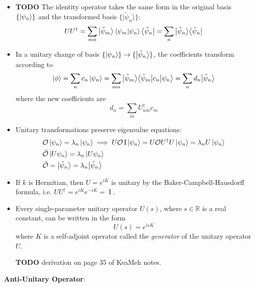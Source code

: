 \documentclass[11pt, a4paper]{article}
\newcommand{\Herm}{Hermitian\xspace}
\renewcommand{\t}[1]{\tilde{#1}}
\renewcommand{\O}{\mathcal{O}}  %
\newcommand{\II}{\operatorname{I}}  %
\newcommand{\p}{\psi}  %
\newcommand{\bket}[1]{\big | {#1} \big \rangle }
\newcommand{\bbra}[1]{ \big \langle {#1} \big |  }
\newcommand{\bmel}[3]{\big \langle {#1} \big | {#2} \big | {#3} \big \rangle}  %
\begin{document}
\begin{itemize}
	\item \textbf{TODO} The identity operator takes the same form in the original basis $ \{\ket{\p_{n}}\} $ and the transformed basis $ \{\bket{\t{\p}_{n}}\} $:
	\begin{equation*}
		UU^{\dagger} = \sum_{mn} \bket{\t{\p}_{m}} \braket{\p_{m}}{\p_{n}} \bbra{\t{\p}_{n}} = \sum_{n}\bket{\t{\p}_{n}}\bbra{\t{\p}_{n}}
	\end{equation*}
	
	\item In a unitary change of basis $ \{\ket{\p_{n}}\} \to \{\bket{\t{\p}_{n}}\} $, the coefficients transform according to
	\begin{equation*}
		\ket{\phi} = \sum_{n}c_{n}\ket{\p_{n}} = \sum_{mn}\bket{\t{\p}_{m}}\bmel{\t{\p}_{m}}{c_{n}}{\p_{n}} = \sum_{n}d_{n}\bket{\tilde{\p}_{n}}
	\end{equation*}
	where the new coefficients are
	\begin{equation*}
		d_{n} = \sum_{m}U_{nm}^{\dagger}c_{m}
	\end{equation*}
	
	\item Unitary transformations preserve eigenvalue equations:
	\begin{align*}
		&\O\ket{\psi_{n}} = \lambda_{n} \ket{\p_{n}} \implies U \O \II \ket{\p_{n}} = U \O U^{\dagger}U \ket{\p_{n}} = \lambda_{n} U\ket{\p_{n}}\\
		&\t{\O} \ket{U\p_{n}} = \lambda_{n}\ket{U\p_{n}}\\
		&\t{\O} = \bket{\t{\p}_{n}} = \lambda_{n} \bket{\t{\p}_{n}}
	\end{align*}
	
	\item If $ k $ is \Herm, then $ U = e^{iK} $ is unitary by the Baker-Campbell-Hausdorff formula, i.e. $ UU^{\dagger} = e^{iK}e^{-iK} = \II $.
	
	\item Every single-parameter unitary operator $ U(s) $, where $ s \in \mathbb{R} $ is a real constant, can be written in the form 
	\begin{equation*}
		U(s) = e^{isK}
	\end{equation*}
	where $ K $ is a self-adjoint operator called the \textit{generator} of the unitary operator $ U $. 
	
	\textbf{TODO} derivation on page 35 of KvaMeh notes.
	
	
	
\end{itemize}
\textbf{Anti-Unitary Operator}: 
\end{document}
